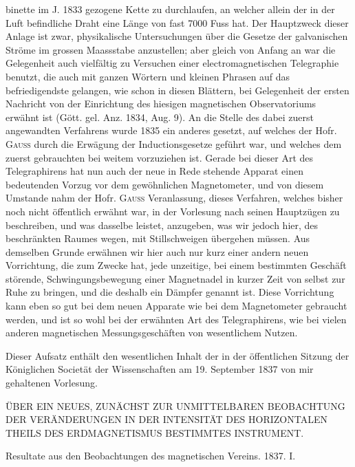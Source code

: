 binette im J. 1833 gezogene Kette zu durchlaufen, an welcher allein der in der Luft befindliche Draht eine Länge von fast 7000 Fuss hat. Der Hauptzweck dieser Anlage ist zwar, physikalische Untersuchungen über die Gesetze der galvanischen Ströme im grossen Maassstabe anzustellen; aber gleich von Anfang an war die Gelegenheit auch vielfältig zu Versuchen einer electromagnetischen Telegraphie benutzt, die auch mit ganzen Wörtern und kleinen Phrasen auf das befriedigendste gelangen, wie schon in diesen Blättern, bei Gelegenheit der ersten Nachricht von der Einrichtung des hiesigen magnetischen Observatoriums erwähnt ist (Gött. gel. Anz. 1834, Aug. 9). An die Stelle des dabei zuerst angewandten Verfahrens wurde 1835 ein anderes gesetzt, auf welches der Hofr. \textsc{Gauss} durch die Erwägung der Inductionsgesetze geführt war, und welches dem zuerst gebrauchten bei weitem vorzuziehen ist. Gerade bei dieser Art des Telegraphirens hat nun auch der neue in Rede stehende Apparat einen bedeutenden Vorzug vor dem gewöhnlichen Magnetometer, und von diesem Umstande nahm der Hofr. \textsc{Gauss} Veranlassung, dieses Verfahren, welches bisher noch nicht öffentlich erwähnt war, in der Vorlesung nach seinen Hauptzügen zu beschreiben, und was dasselbe leistet, anzugeben, was wir jedoch hier, des beschränkten Raumes wegen, mit Stillschweigen übergehen müssen. Aus demselben Grunde erwähnen wir hier auch nur kurz einer andern neuen Vorrichtung, die zum Zwecke hat, jede unzeitige, bei einem bestimmten Geschäft störende, Schwingungsbewegung einer Magnetnadel in kurzer Zeit von selbst zur Ruhe zu bringen, und die deshalb ein Dämpfer genannt ist. Diese Vorrichtung kann eben so gut bei dem neuen Apparate wie bei dem Magnetometer gebraucht werden, und ist so wohl bei der erwähnten Art des Telegraphirens, wie bei vielen anderen magnetischen Messungsgeschäften von wesentlichem Nutzen.

\expandafter\def\csname HistoricalNoteText363\endcsname{Dieser Aufsatz enthält den wesentlichen Inhalt der in der öffentlichen Sitzung der Königlichen Societät der Wissenschaften am 19. September 1837 von mir gehaltenen Vorlesung.}
\clearpage
{}
\begin{center}
{\large ÜBER EIN NEUES, ZUNÄCHST ZUR UNMITTELBAREN BEOBACHTUNG DER VERÄNDERUNGEN IN DER INTENSITÄT DES HORIZONTALEN THEILS DES ERDMAGNETISMUS BESTIMMTES INSTRUMENT.}
\par\medskip
Resultate aus den Beobachtungen des magnetischen Vereins. 1837. I.
\end{center}

